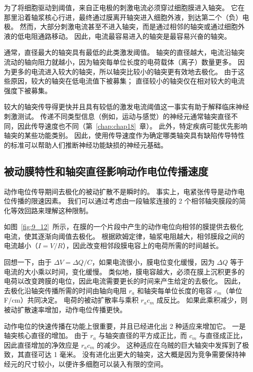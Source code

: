 为了将细胞驱动到阈值，来自正电极的刺激电流必须穿过细胞膜进入轴突。
它在那里沿着轴浆核心行进，最终通过膜离开轴突进入细胞外液，到达第二个（负）电极。
然而，大部分刺激电流甚至不进入轴突，而是通过相邻的轴突或通过细胞外液的低电阻通路移动。
因此，电流最容易进入的轴突是最容易兴奋的轴突。


通常，直径最大的轴突具有最低的此类激发阈值。
轴突的直径越大，电流沿轴突流动的轴向阻力就越小，因为轴突每单位长度的电荷载体（离子）数量更多。
因为更多的电流进入较大的轴突，所以轴突比较小的轴突更有效地去极化。
由于这些原因，较大的轴突在低电流值下被募集；
直径较小的轴突仅在相对较大的电流强度下被募集。


较大的轴突传导得更快并且具有较低的激发电流阈值这一事实有助于解释临床神经刺激测试。
传递不同类型信息（例如，运动与感觉）的神经元通常轴突直径不同，因此传导速度也不同（第~\ref{chap:chap18}~章）。
此外，特定疾病可能优先影响轴突的某些功能类别。
因此，使用传导速度作为确定哪类轴突具有缺陷传导特性的标准可以帮助人们推断神经功能缺损的神经元基础。



\subsection{被动膜特性和轴突直径影响动作电位传播速度}

动作电位传导期间去极化的被动扩散不是瞬时的。
事实上，电紧张传导是动作电位传播的限速因素。
我们可以通过考虑由一段轴浆连接的 2 个相邻轴突膜段的简化等效回路来理解这种限制。


如图~\ref{fig:9_12}~所示，在膜的一个片段中产生的动作电位向相邻的膜提供去极化电流，使其逐渐向阈值去极化。 
根据欧姆定律，轴浆电阻越大，相邻膜段之间的电流越小（$I = V / R$），因此改变相邻段膜电容上的电荷所需的时间越长。


回想一下，由于 $\Delta V = \Delta Q / C$，如果电流很小，膜电位变化缓慢，因为 $\Delta Q$ 等于电流的大小乘以时间，变化缓慢。
类似地，膜电容越大，必须在膜上沉积更多的电荷以改变跨膜的电位，因此电流需要更长的时间来产生给定的去极化。
因此，去极化沿轴突传播所需的时间由轴向电阻 $r_a$ 和轴突每单位长度的电容 $c_m$（单位 F/cm）共同决定。
电荷的被动扩散率与乘积 $r_a c_m$ 成反比。
如果此乘积减少，则被动扩散速率增加，动作电位传播更快。


动作电位的快速传播在功能上很重要，并且已经进化出 2 种适应来增加它。
一是轴突核心直径的增加。
由于 $r_a$ 与轴突直径的平方成正比，而 $c_m$ 与直径成正比，因此直径增加的净效应是 $r_a c_m$ 的减少。
这种适应在乌贼的巨大轴突中发挥到了极致，其直径可达 1 毫米。
没有进化出更大的轴突，这大概是因为竞争需要保持神经元的尺寸较小，以便许多细胞可以装入有限的空间。


